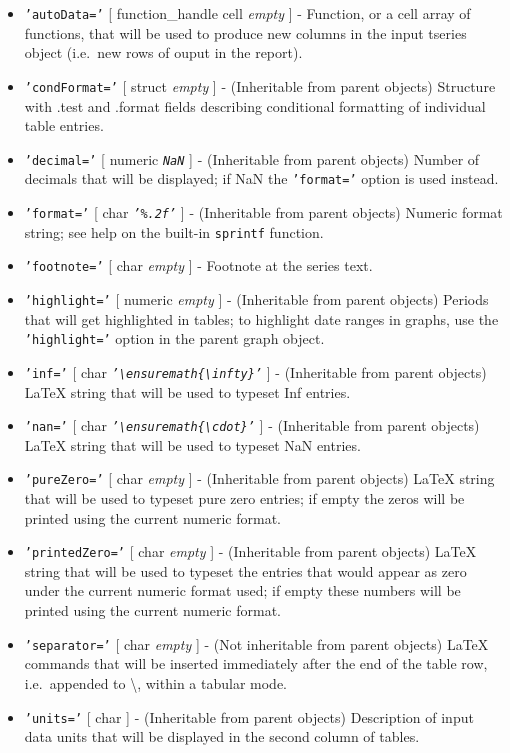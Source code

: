 \begin{itemize}
\item
  \texttt{'autoData='} {[} function\_handle \textbar{} cell \textbar{}
  \emph{empty} {]} - Function, or a cell array of functions, that will
  be used to produce new columns in the input tseries object (i.e.~new
  rows of ouput in the report).
\item
  \texttt{'condFormat='} {[} struct \textbar{} \emph{empty} {]} -
  (Inheritable from parent objects) Structure with .test and .format
  fields describing conditional formatting of individual table entries.
\item
  \texttt{'decimal='} {[} numeric \textbar{} \emph{\texttt{NaN}} {]} -
  (Inheritable from parent objects) Number of decimals that will be
  displayed; if NaN the \texttt{'format='} option is used instead.
\item
  \texttt{'format='} {[} char \textbar{} \emph{\texttt{'\%.2f'}} {]} -
  (Inheritable from parent objects) Numeric format string; see help on
  the built-in \texttt{sprintf} function.
\item
  \texttt{'footnote='} {[} char \textbar{} \emph{empty} {]} - Footnote
  at the series text.
\item
  \texttt{'highlight='} {[} numeric \textbar{} \emph{empty} {]} -
  (Inheritable from parent objects) Periods that will get highlighted in
  tables; to highlight date ranges in graphs, use the
  \texttt{'highlight='} option in the parent graph object.
\item
  \texttt{'inf='} {[} char \textbar{}
  \emph{\texttt{'\textbackslash{}ensuremath\{\textbackslash{}infty\}'}}
  {]} - (Inheritable from parent objects) LaTeX string that will be used
  to typeset Inf entries.
\item
  \texttt{'nan='} {[} char \textbar{}
  \emph{\texttt{'\textbackslash{}ensuremath\{\textbackslash{}cdot\}'}}
  {]} - (Inheritable from parent objects) LaTeX string that will be used
  to typeset NaN entries.
\item
  \texttt{'pureZero='} {[} char \textbar{} \emph{empty} {]} -
  (Inheritable from parent objects) LaTeX string that will be used to
  typeset pure zero entries; if empty the zeros will be printed using
  the current numeric format.
\item
  \texttt{'printedZero='} {[} char \textbar{} \emph{empty} {]} -
  (Inheritable from parent objects) LaTeX string that will be used to
  typeset the entries that would appear as zero under the current
  numeric format used; if empty these numbers will be printed using the
  current numeric format.
\item
  \texttt{'separator='} {[} char \textbar{} \emph{empty} {]} - (Not
  inheritable from parent objects) LaTeX commands that will be inserted
  immediately after the end of the table row, i.e.~appended to
  \textbackslash{}, within a tabular mode.
\item
  \texttt{'units='} {[} char {]} - (Inheritable from parent objects)
  Description of input data units that will be displayed in the second
  column of tables.
\end{itemize}


